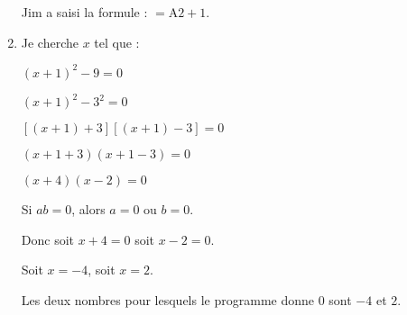 \begin{enumerate}

Jim a saisi la formule : $= \text{A}2 + 1$.
\item %
Je cherche $x$ tel  que : 

$(x + 1)^2 - 9 = 0$

$(x + 1)^2 - 3^2 = 0$

$[(x + 1) + 3][(x + 1) - 3] = 0$

$(x + 1 + 3)(x + 1 - 3) = 0$

$(x + 4)(x - 2) = 0$

Si $ab = 0$, alors $a = 0$ ou $b = 0$.

Donc soit $x + 4 = 0$ soit $x - 2 = 0$.

Soit $x = - 4$, soit $x = 2$.

Les deux nombres pour lesquels le programme donne $0$ sont  $- 4$ et $2$.
\end{enumerate}

\vspace{0,5cm}

